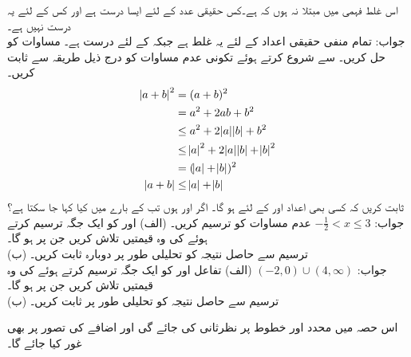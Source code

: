 اس غلط فہمی میں مبتلا نہ ہوں کہ  ہے۔کس حقیقی عدد  کے لئے ایسا درست ہے اور کس کے لئے یہ درست نہیں ہے۔\\
جواب:\quad
تمام منفی حقیقی اعداد کے لئے یہ غلط ہے جبکہ  کے لئے درست ہے۔
مساوات  کو حل کریں۔
  سے شروع کرتے ہوئے تکونی عدم مساوات کو درج ذیل طریقہ سے ثابت کریں۔
\begin{align*}
\abs{a+b}^2&=(a+b)^2\\
&=a^2+2ab+b^2\\
&\le a^2+2\abs{a}\abs{b}+b^2\\
&\le \abs{a}^2+2\abs{a}\abs{b}+\abs{b}^2\\
&=(\abs{a}+\abs{b})^2\\
\abs{a+b}&\le \abs{a}+\abs{b}
\end{align*}
ثابت کریں کہ کسی بھی اعداد  اور  کے لئے   ہو گا۔
اگر  اور  ہوں تب  کے بارے میں کیا کہا جا سکتا ہے؟\\
جواب:\quad
$-\tfrac{1}{2}<x\le 3$
عدم مساوات  کو ترسیم کریں۔
(الف) \quad {} اور  کو ایک جگہ ترسیم کرتے ہوئے  کی وہ قیمتیں تلاش کریں جن پر  ہو گا۔\\
(ب) \quad
ترسیم سے حاصل نتیجہ کو تحلیلی طور پر دوبارہ ثابت کریں۔ \\
جواب:\quad
$(-2,0)\cup (4,\infty)$
(الف) \quad
تفاعل  اور  کو ایک جگہ ترسیم کرتے ہوئے  کی وہ قیمتیں تلاش کریں جن پر  ہو گا۔\\
(ب)\quad
ترسیم سے حاصل نتیجہ کو تحلیلی طور پر ثابت کریں۔

اس حصہ میں محدد اور خطوط پر نظرثانی کی جائے گی اور اضافے کی تصور پر بھی غور کیا جائے گا۔

